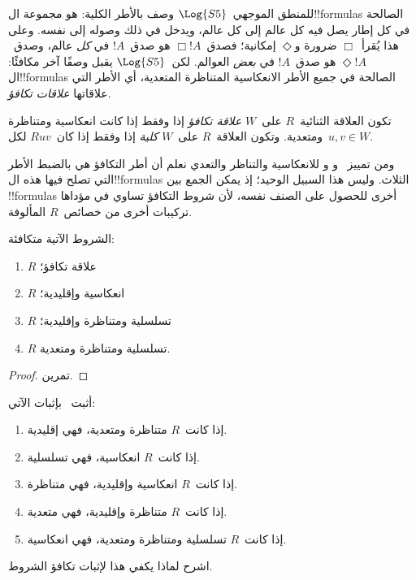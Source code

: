\documentclass[../../../include/open-logic-section]{subfiles}
\begin{document}


للمنطق الموجهي~$\Log{S5}$ وصف بالأطر الكلية: هو مجموعة
ال!!{formula}s الصالحة في كل إطار يصل فيه كل عالم إلى كل عالم،
ويدخل في ذلك وصوله إلى نفسه. وعلى هذا يُقرأ~$\Box$ ضرورة
و$\Diamond$ إمكانية؛ فصدق~$\Box !A$ هو صدق~$!A$ في \emph{كل}
عالم، وصدق~$\Diamond !A$ هو صدق~$!A$ في \emph{بعض} العوالم.
لكن~$\Log{S5}$ يقبل وصفًا آخر مكافئًا: ال!!{formula}s الصالحة
في جميع الأطر الانعكاسية المتناظرة المتعدية، أي الأطر التي علاقاتها
\emph{علاقات تكافؤ}.

\begin{defn}
  تكون العلاقة الثنائية~$R$ على~$W$ \emph{علاقة تكافؤ} إذا وفقط إذا
  كانت انعكاسية ومتناظرة ومتعدية. وتكون العلاقة~$R$ على~$W$
  \emph{كلية} إذا وفقط إذا كان~$Ruv$ لكل~$u,v \in W$.
\end{defn}

ومن تمييز~ و و للانعكاسية والتناظر والتعدي
نعلم أن أطر التكافؤ هي بالضبط الأطر التي تصلح فيها هذه
ال!!{formula}s الثلاث. وليس هذا السبيل الوحيد؛ إذ يمكن الجمع
بين !!{formula}s أخرى للحصول على الصنف نفسه، لأن شروط التكافؤ
تساوي في مؤداها تركيبات أخرى من خصائص~$R$ المألوفة.

\begin{prop}
  الشروط الآتية متكافئة:
  \begin{enumerate}
  \item $R$ علاقة تكافؤ؛
  \item $R$ انعكاسية وإقليدية؛
  \item $R$ تسلسلية ومتناظرة وإقليدية؛
  \item $R$ تسلسلية ومتناظرة ومتعدية.
  \end{enumerate}
\end{prop}

\begin{proof}
  تمرين.
\end{proof}

\begin{prob}
  أثبت~ بإثبات الآتي:
  \begin{enumerate}
  \item إذا كانت~$R$ متناظرة ومتعدية، فهي إقليدية.
  \item إذا كانت~$R$ انعكاسية، فهي تسلسلية.
  \item إذا كانت~$R$ انعكاسية وإقليدية، فهي متناظرة.
  \item إذا كانت~$R$ متناظرة وإقليدية، فهي متعدية.
  \item إذا كانت~$R$ تسلسلية ومتناظرة ومتعدية، فهي انعكاسية.
  \end{enumerate}
  اشرح لماذا يكفي هذا لإثبات تكافؤ الشروط.
\end{prob}
\end{document}
